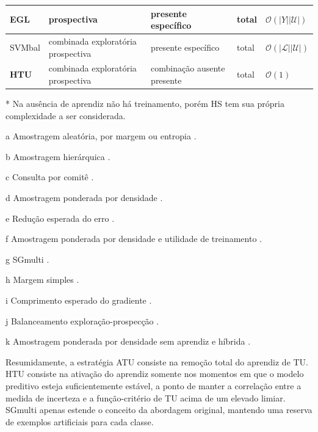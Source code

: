 \begin{quadro}
\begin{threeparttable}
\begin{tabular}{|l|p{3cm}|p{2cm}|l|p{3.2cm}|}
EGL\tnote{i}			& prospectiva					&{presente \phantom{oooo} específico}	& total							&$\mathcal{O}(|Y||\mathcal{U}|)$  \\ \hline
SVMbal\tnote{j}			&{combinada exploratória prospectiva}&{presente \phantom{oooo} específico}			& total							&$\mathcal{O}(|\mathcal{L}||\mathcal{U}|)$  \\ \hline
\textbf{HTU}\tnote{k}			&{combinada exploratória prospectiva}&{combinação \phantom{oo} ausente\phantom{oooo} presente}	&{total}			&$\mathcal{O}(1)$  \\ 
\hline
\end{tabular}
\begin{tablenotes}
\item [*] Na ausência de aprendiz não há treinamento, porém HS tem sua própria complexidade a ser considerada.
\item [a] Amostragem aleatória, por margem ou entropia \cite{series/synthesis/2012Settles}.
\item [b] Amostragem hierárquica \cite{journals/tcs/Dasgupta11}.
\item [c] Consulta por comitê \cite{conf/icml/AbeM98}.
\item [d] Amostragem ponderada por densidade \cite{settles2008curious}.
\item [e] Redução esperada do erro \cite{conf/ijcai/GuoG07}.
\item [f] Amostragem ponderada por densidade e utilidade de treinamento \cite{settles2010active,journals/coling/FujiiITT98}.
\item [g] SGmulti \cite{conf/hais/SantosC14}.
\item [h] Margem simples \cite{journals/jmlr/TongK01}.
\item [i] Comprimento esperado do gradiente \cite{conf/nips/SettlesCR07}.
\item [j] Balanceamento exploração-prospecção \cite{conf/icdm/OsugiKS05}.
\item [k] Amostragem ponderada por densidade sem aprendiz e híbrida \cite{bracis15}.
\end{tablenotes}
\end{threeparttable}
\end{quadro}

Resumidamente, a estratégia ATU consiste na remoção total do aprendiz de TU.
HTU consiste na ativação do aprendiz somente nos momentos em que o modelo preditivo esteja suficientemente estável, a ponto de manter a correlação entre a medida de incerteza e a função-critério de TU acima de um elevado limiar. 
SGmulti apenas estende o conceito da abordagem original, mantendo uma reserva de exemplos artificiais para cada classe.

